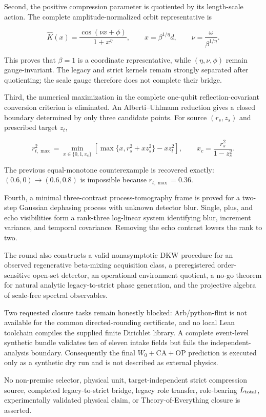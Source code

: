 \documentclass[11pt,a4paper,openany]{report}
\begin{document}
Second, the positive compression parameter is quotiented by its length-scale action. The complete amplitude-normalized orbit representative is

\[
\widehat K(x)=
\frac{\cos(\nu x+\phi)}{1+x^\eta},
\qquad
x=\beta^{1/\eta}d,
\qquad
\nu=\frac{\omega}{\beta^{1/\eta}}.
\]

This proves that \(\beta=1\) is a coordinate representative, while \((\eta,\nu,\phi)\) remain gauge-invariant. The legacy and strict kernels remain strongly separated after quotienting; the scale gauge therefore does not complete their bridge.

Third, the numerical maximization in the complete one-qubit reflection-covariant conversion criterion is eliminated. An Alberti--Uhlmann reduction gives a closed boundary determined by only three candidate points. For source \((r_s,z_s)\) and prescribed target \(z_t\),

\[
r_{t,\max}^2
=
\min_{x\in\{0,1,x_c\}}
\left[
\max\{x,r_s^2+xz_s^2\}-xz_t^2
\right],
\qquad
x_c=\frac{r_s^2}{1-z_s^2}.
\]

The previous equal-monotone counterexample is recovered exactly: \((0.6,0)\to(0.6,0.8)\) is impossible because \(r_{t,\max}=0.36\).

Fourth, a minimal three-contrast process-tomography frame is proved for a two-step Gaussian dephasing process with unknown detector blur. Single, plus, and echo visibilities form a rank-three log-linear system identifying blur, increment variance, and temporal covariance. Removing the echo contrast lowers the rank to two.

The round also constructs a valid nonasymptotic DKW procedure for an observed regenerative beta-mixing acquisition class, a preregistered order-sensitive open-set detector, an operational environment quotient, a no-go theorem for natural analytic legacy-to-strict phase generation, and the projective algebra of scale-free spectral observables.

Two requested closure tasks remain honestly blocked: Arb/\allowbreak{}python-flint is not available for the common directed-rounding certificate, and no local Lean toolchain compiles the supplied finite Dirichlet library. A complete event-level synthetic bundle validates ten of eleven intake fields but fails the independent-analysis boundary. Consequently the final \(W_0+\mathrm{CA}+\mathrm{OP}\) prediction is executed only as a synthetic dry run and is not described as external physics.

No non-premise selector, physical unit, target-independent strict compression source, completed legacy-to-strict bridge, legacy role transfer, role-bearing \(L_{\rm total}\), experimentally validated physical claim, or Theory-of-Everything closure is asserted.
\end{document}
